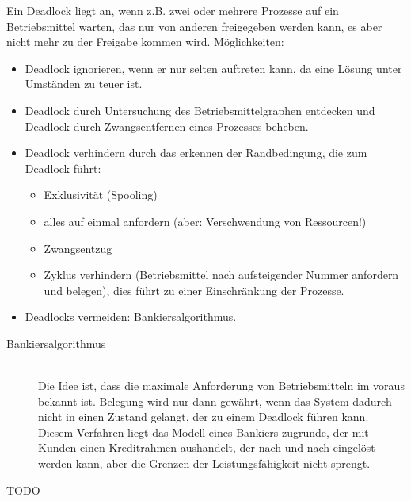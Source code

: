\begin{answer}
Ein Deadlock liegt an, wenn z.B. zwei oder mehrere Prozesse auf ein Betriebsmittel warten, das nur
von anderen freigegeben werden kann, es aber nicht mehr zu der Freigabe kommen wird.
Möglichkeiten:
\begin{itemize}
\item Deadlock ignorieren, wenn er nur selten auftreten kann, da eine Lösung unter Umständen zu
teuer ist.
\item Deadlock durch Untersuchung des Betriebsmittelgraphen entdecken und Deadlock durch Zwangsentfernen
eines Prozesses beheben.
\item Deadlock verhindern durch das erkennen der Randbedingung, die zum Deadlock führt:
\begin{itemize}
\item Exklusivität (Spooling)
\item alles auf einmal anfordern (aber: Verschwendung von Ressourcen!)
\item Zwangsentzug
\item Zyklus verhindern (Betriebsmittel nach aufsteigender Nummer anfordern und belegen), dies führt
zu einer Einschränkung der Prozesse.
\end{itemize}
\item Deadlocks vermeiden: Bankiersalgorithmus.
\end{itemize}
\begin{description}
\item[Bankiersalgorithmus] \hfill \\
Die Idee ist, dass die maximale Anforderung von Betriebsmitteln im voraus bekannt ist. Belegung
wird nur dann gewährt, wenn das System dadurch nicht in einen Zustand gelangt, der zu einem
Deadlock führen kann. Diesem Verfahren liegt das Modell eines Bankiers zugrunde, der mit Kunden
einen Kreditrahmen aushandelt, der nach und nach eingelöst werden kann, aber die Grenzen der
Leistungsfähigkeit nicht sprengt.
\end{description}
\end{answer}

\begin{answer}
TODO
\end{answer}

